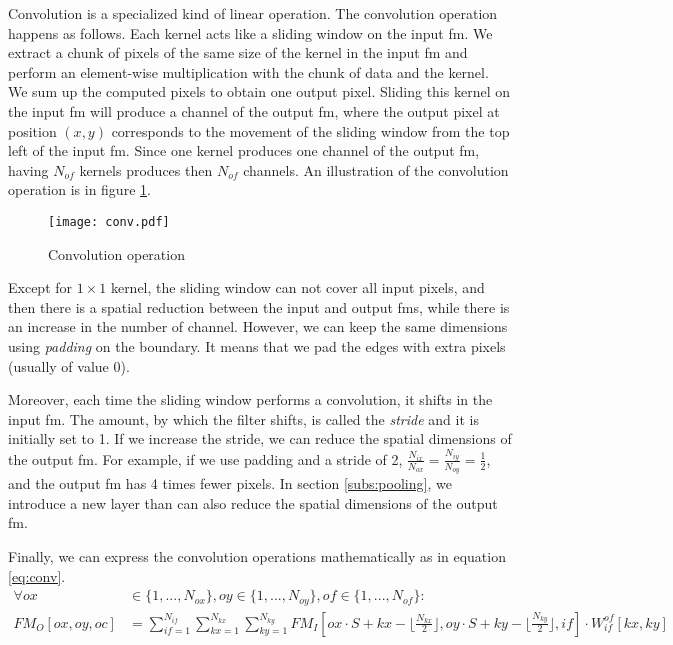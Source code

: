 Convolution is a specialized kind of linear operation. The convolution operation happens as follows. Each kernel acts like a sliding window on the input \acrshort{fm}. We extract a chunk of pixels of the same size of the kernel in the input \acrshort{fm} and perform an element-wise multiplication with the chunk of data and the kernel. We sum up the computed pixels to obtain one output pixel. Sliding this kernel on the input \acrshort{fm} will produce a channel of the output \acrshort{fm}, where the output pixel at position $(x, y)$ corresponds to the movement of the sliding window from the top left of the input \acrshort{fm}. Since one kernel produces one channel of the output \acrshort{fm}, having $N_{of}$ kernels produces then $N_{of}$ channels. An illustration of the convolution operation is in figure \ref{fig:convolution}.
%
\begin{figure}
    \centering
    \texttt{[image: conv.pdf]}
    \caption{Convolution operation}
    \label{fig:convolution}
\end{figure}

Except for $1 \times 1$ kernel, the sliding window can not cover all input pixels, and then there is a spatial reduction between the input and output \acrshort{fm}s, while there is an increase in the number of channel. However, we can keep the same dimensions using \textit{padding} on the boundary. It means that we pad the edges with extra pixels (usually of value 0).

Moreover, each time the sliding window performs a convolution, it shifts in the input \acrshort{fm}. The amount, by which the filter shifts, is called the \textit{stride} and it is initially set to 1. If we increase the stride, we can reduce the spatial dimensions of the output \acrshort{fm}. For example, if we use padding and a stride of 2, $\frac{N_{ix}}{N_{ox}} = \frac{N_{iy}}{N_{oy}} = \frac{1}{2}$, and the output \acrshort{fm} has 4 times fewer pixels. In section \ref{subs:pooling}, we introduce a new layer than can also reduce the spatial dimensions of the output \acrshort{fm}.

Finally, we can express the convolution operations mathematically as in equation \eqref{eq:conv}.
%
\begin{equation}
    \begin{split}
        \forall ox &\in \{ 1, ..., N_{ox} \}, oy \in \{ 1, ..., N_{oy} \}, of \in \{ 1, ..., N_{of} \} : \\
        FM_O[ox, oy, oc] &= \sum^{N_{if}}_{if=1}
        \sum^{N_{kx}}_{kx=1}
        \sum^{N_{ky}}_{ky=1}
        FM_I[ox \cdot S + kx - \lfloor \frac{N_{kx}}{2} \rfloor,  oy \cdot S + ky - \lfloor \frac{N_{ky}}{2} \rfloor, if] \cdot
        W^{of}_{if}[kx, ky]
    \end{split}
    \label{eq:conv}
\end{equation}

